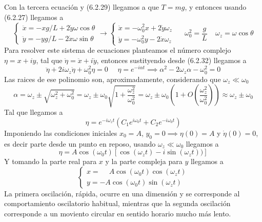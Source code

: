 Con la tercera ecuación y (6.2.29) llegamos a que $T=mg$, y entonces usando (6.2.27) llegamos a 
\begin{equation} \label{6.1.1}
    \left\{\begin{matrix}
        \ddot{x} = -xg/L  +2\dot{y}\omega\cos\theta \\
        \ddot{y} = -yg/L -2\dot{x}\omega \sin\theta
      \end{matrix}\right. \rightarrow
    \left\{\begin{matrix}
        \ddot{x} = -\omega_0^2 x  +2\dot{y}\omega_z \\
        \ddot{y} = -\omega_0^2 y -2\dot{x}\omega_z
    \end{matrix}\right. \ \ \ \ \ \ \omega_0^2 = \frac{g}{L} \ \ \ \ \ \omega_z = \omega \cos\theta
\end{equation} 
Para resolver este sistema de ecuaciones planteamos el número complejo $\eta = x+iy$, tal que $\ddot{\eta} = \ddot{x}+ i\ddot{y}$, entonces sustityendo desde (6.2.32) llegamos a 
\begin{equation} \label{6.1.1}
    \ddot{\eta} + 2 i \omega_z \dot{\eta} + \omega_0^2 \eta = 0 \ \ \ \ \ \ \eta = e^{-i\alpha t} \implies \alpha^2 -2\omega_z\alpha-\omega_0^2 = 0
\end{equation} 
Las raices de ese polinomio son, aproximadamente, considerando que $\omega_z \ll \omega_0$
\begin{equation} \label{6.1.1}
    \alpha = \omega_z \pm \sqrt{\omega_z^2+\omega_0^2} = \omega_z \pm \omega_0 \sqrt{1+\frac{\omega_z^2}{\omega_0^2}} = \omega_z \pm \omega_0 \left(1 + O\left(\frac{\omega_z^2}{\omega_0^2}\right)\right) \approx \omega_z \pm \omega_0
\end{equation} 
Tal que llegamos a 
\begin{equation} \label{6.1.1}
    \eta = e^{-i\omega_z t}\left(C_1 e^{i\omega_0t}+C_2e^{-i\omega_0t}\right)
\end{equation} 
Imponiendo las condiciones iniciales $x_0 = A$, $y_0 = 0 \implies \eta(0) = A$ y $\dot{\eta}(0) = 0$, es decir parte desde un punto en reposo, usando $\omega_z \ll \omega_0$ llegamos a 
\begin{equation} \label{6.1.1}
    \eta = A \cos(\omega_0t)\left[\cos(\omega_zt) -i \sin(\omega_zt))\right]
\end{equation} 
Y tomando la parte real para $x$ y la parte compleja para $y$ llegamos a 
\begin{equation} \label{6.1.1}
    \left\{\begin{matrix}
        x = \phantom{-}A \cos(\omega_0t)\cos(\omega_zt) \\
        y = -A \cos(\omega_0t)\sin(\omega_zt)
    \end{matrix}\right.
\end{equation} 
La primera oscilación, rápida, ocurre en una dimensión y se corresponde al comportamiento oscilatorio habitual, mientras que la segunda oscilación corresponde a un moviento circular en sentido horario mucho más lento.
